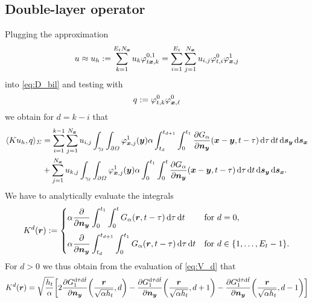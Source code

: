 \documentclass[a4paper,11pt]{article}
\begin{document}
\subsection{Double-layer operator}

Plugging the approximation
\begin{equation*}
 u \approx u_h := \sum_{k=1}^{E_t N_{{\bm{x}}}} u_k \varphi^{0,1}_{t{{\bm{x}}},k} = \sum_{i=1}^{E_t} \sum_{j=1}^{N_{{\bm{x}}}} u_{i,j} \varphi^0_{t,i} \varphi^1_{{{\bm{x}}},j}
\end{equation*}
into \eqref{eq:D_bil} and testing with
\begin{equation*}
  q := \varphi^0_{t,k} \varphi^0_{{{\bm{x}}},\ell}
\end{equation*}
we obtain for $d=k-i$ that
\begin{align*}
  \langle Ku_h, q \rangle_\Sigma &= \sum_{i=1}^{k-1} \sum_{j=1}^{N_{{\bm{x}}}} u_{i,j} \int_{\gamma_\ell} \int_{\partial\Omega} \varphi^1_{{{\bm{x}}},j}({{\bm{y}}}) \alpha \int_{t_d}^{t_{d+1}} \int_{0}^{t_1} \frac{\partial G_\alpha}{\partial {\ensuremath{{\bm{n}}}}_{{\bm{y}}}}({{\bm{x}}}-{{\bm{y}}},t-\tau) \,{\mathrm{d}}\tau \,{\mathrm{d}} t \,{\mathrm{d}}{{\bm{s}}}_{{\bm{y}}} \,{\mathrm{d}}{{\bm{s}}}_{{\bm{x}}} \\
  &+ \sum_{j=1}^{N_{{\bm{x}}}} u_{k,j} \int_{\gamma_\ell} \int_{\partial\Omega} \varphi^1_{{{\bm{x}}},j}({{\bm{y}}}) \alpha \int_{0}^{t_1} \int_{0}^{t} \frac{\partial G_\alpha}{\partial {\ensuremath{{\bm{n}}}}_{{\bm{y}}}}({{\bm{x}}}-{{\bm{y}}},t-\tau) \,{\mathrm{d}}\tau \,{\mathrm{d}} t \,{\mathrm{d}}{{\bm{s}}}_{{\bm{y}}} \,{\mathrm{d}}{{\bm{s}}}_{{\bm{x}}}.
\end{align*}
We have to analytically evaluate the integrals
\begin{equation*}
  K^d({{\bm{r}}}) := 
  \begin{cases}
  \displaystyle
    \alpha \frac{\partial}{\partial {\ensuremath{{\bm{n}}}}_{{\bm{y}}}} \int_{0}^{t_1} \int_{0}^{t} G_\alpha({{\bm{r}}},t-\tau) \,{\mathrm{d}}\tau \,{\mathrm{d}} t & \text{for } d = 0, \\[4mm]
  \displaystyle
    \alpha \frac{\partial}{\partial {\ensuremath{{\bm{n}}}}_{{\bm{y}}}} \int_{t_d}^{t_{d+1}} \int_{0}^{t_1} G_\alpha({{\bm{r}}},t-\tau) \,{\mathrm{d}}\tau \,{\mathrm{d}} t & \text{for } d \in \{1,\ldots,E_t-1\}.
  \end{cases}
\end{equation*}
For $d > 0$ we thus obtain from the evaluation of \eqref{eq:V_d} that
\begin{align*}
  K^d({{\bm{r}}}) = \sqrt{\frac{h_t}{\alpha}} \bigg[ 2 \frac{\partial G^{{\mathrm{d}}\hat\tau{\mathrm{d}}\hat t}_1}{\partial {\ensuremath{{\bm{n}}}}_{{\bm{y}}}} \bigg(\frac{{{\bm{r}}}}{\sqrt{\alpha h_t}},d\bigg) - \frac{\partial G^{{\mathrm{d}}\hat\tau{\mathrm{d}}\hat t}_1}{\partial {\ensuremath{{\bm{n}}}}_{{\bm{y}}}}\bigg(\frac{{{\bm{r}}}}{\sqrt{\alpha h_t}},d+1\bigg) - \frac{\partial G^{{\mathrm{d}}\hat\tau{\mathrm{d}}\hat t}_1}{\partial {\ensuremath{{\bm{n}}}}_{{\bm{y}}}}\bigg(\frac{{{\bm{r}}}}{\sqrt{\alpha h_t}},d-1\bigg) \bigg]
\end{align*}
\end{document}
